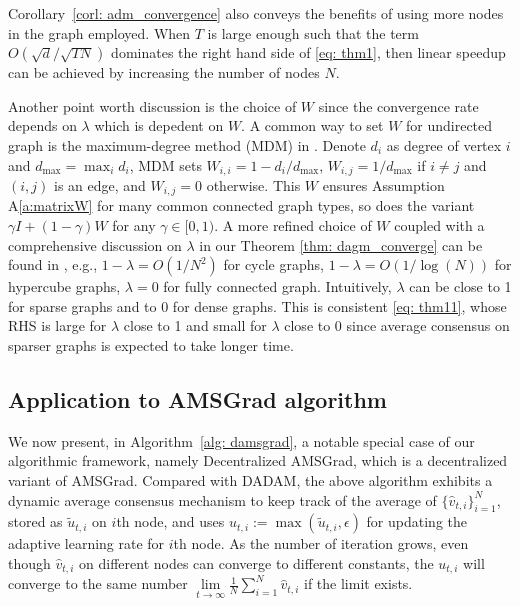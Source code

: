 \documentclass[11pt]{article}
\begin{document}
 Corollary~\ref{corl:  adm_convergence} also conveys the benefits of using more nodes in the graph employed. 
When $T$ is large enough such that the term $O(\sqrt{d}/\sqrt{TN})$ dominates the right hand side of \eqref{eq: thm1}, then linear speedup can be achieved by increasing the number of nodes $N$.   

Another point worth discussion is the choice of $W$ since the convergence rate depends on $\lambda$ which is depedent on $W$. A common way to set $W$ for undirected graph is the maximum-degree method (MDM) in \cite{boyd2004fastest}. Denote $d_i$ as degree of vertex $i$ and $d_{\max} = \max_i d_i$, MDM sets $W_{i,i} = 1-d_i/d_{\max}$, $W_{i,j} = 1/d_{\max}$ if $i\neq j$ and $(i,j)$ is an edge,  and $W_{i,j} = 0$ otherwise. This $W$ ensures Assumption A\ref{a:matrixW} for many common connected graph types, so does the variant $\gamma I + (1-\gamma) W$ for any $\gamma \in [0,1)$.  
A more refined choice of $W$ coupled with a comprehensive discussion on $\lambda$ in our Theorem \ref{thm: dagm_converge} can be found in \cite{boyd2009fastest}, e.g., $1-\lambda =O(1/N^2)$ for cycle graphs, $1-\lambda =O(1/\log(N))$ for hypercube graphs, $\lambda = 0$ for fully connected graph. 
Intuitively, $\lambda$ can be close to 1 for sparse graphs and to 0 for dense graphs.
This is consistent \eqref{eq: thm11}, whose RHS is large for $\lambda$ close to 1 and small for $\lambda $ close to 0 since average consensus on sparser graphs is expected to take longer time.

\subsection{Application to AMSGrad algorithm}\label{sec:amsgrad}


We now present, in Algorithm~\ref{alg: damsgrad}, a notable special case of our algorithmic framework, namely Decentralized AMSGrad, which is a decentralized variant of AMSGrad.
Compared with DADAM, the above algorithm exhibits a dynamic average consensus mechanism to keep track of the average of $\{\hat v_{t,i}\}_{i=1}^N$, stored as $\tilde u_{t,i}$ on $i$th node, and uses $u_{t,i} := \max(\tilde u_{t,i}, \epsilon)$ for updating the adaptive learning rate for $i$th node. 
As the number of iteration grows, even though $\hat v_{t,i}$ on different nodes can converge to different constants, the $u_{t,i}$ will converge to the same number $ \lim \limits_{t \rightarrow \infty} \frac{1}{N} \sum_{i=1}^N\hat v_{t,i} $ if the limit exists. 
\end{document}
